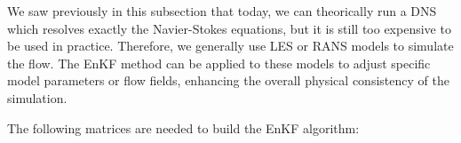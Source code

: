 We saw previously in this subsection that today, we can theorically run a DNS which resolves exactly the Navier-Stokes equations, but it is still too expensive to be used in practice. Therefore, we generally use LES or RANS models to simulate the flow. The EnKF method can be applied to these models to adjust specific model parameters or flow fields, enhancing the overall physical consistency of the simulation.


The following matrices are needed to build the EnKF algorithm:


